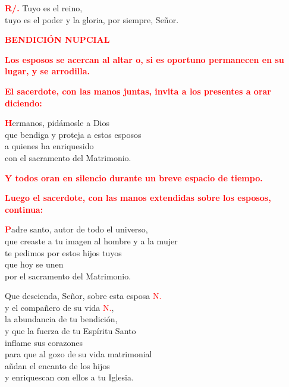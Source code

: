 \documentclass[12pt, letterpaper, spanish]{report}
\begin{document}
\Large \hspace{-0.9cm} {\bfseries \textcolor{red}{R/.}} \hspace{0.5cm} Tuyo es el reino,\\
tuyo es el poder y la gloria, por siempre, Se\~nor.\newline

\newpage

\Large {\bfseries \textcolor{red}{BENDICI\'ON NUPCIAL}} \newline

\large{\bfseries \textcolor{red}{Los esposos se acercan al altar o,
si es oportuno permanecen en su lugar, y se arrodilla.}}\newline

\large{\bfseries \textcolor{red}{El sacerdote, con las manos juntas, invita a los presentes a orar diciendo:}}\newline

\Large \lettrine{\bfseries \textcolor{red}{H}}{}ermanos, pid\'amosle a Dios\\
que bendiga y proteja a estos esposos\\
a quienes ha enriquesido\\
con el sacramento del Matrimonio.\newline

\large{\bfseries \textcolor{red}{Y todos oran en silencio durante un breve espacio de tiempo.}}\newline

\large{\bfseries \textcolor{red}{Luego el sacerdote, con las manos extendidas sobre los esposos, continua:}}\newline

\Large \lettrine{\bfseries \textcolor{red}{P}}{}adre santo, autor de todo el universo,\\
que creaste a tu imagen al hombre y a la mujer\\
te pedimos por estos hijos tuyos\\
que hoy se unen\\
por el sacramento del Matrimonio.\newline

Que descienda, Se\~nor, sobre esta esposa \textcolor{red}{N.}\\
y el compa\~nero de su vida \textcolor{red}{N.},\\
la abundancia de tu bendici\'on,\\
y que la fuerza de tu Esp\'iritu Santo\\
inflame sus corazones\\
para que al gozo de su vida matrimonial\\
a\~ndan el encanto de los hijos\\
y enriquescan con ellos a tu Iglesia.\newline
\end{document}
